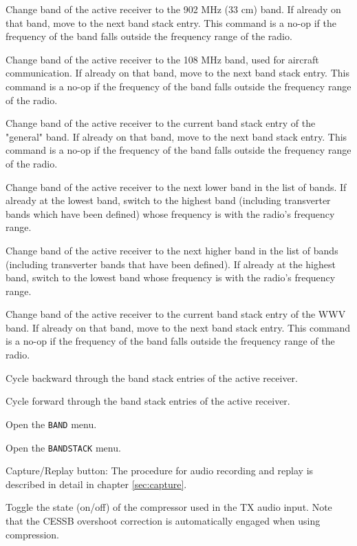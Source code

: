 \documentclass[12pt]{book}
\begin{document}
{Change band of the active receiver to the 902 MHz (33 cm) band. If already on that band, move to
the next band stack entry. This command is a no-op if the frequency of the band falls outside the frequency
range of the radio.}

{Change band of the active receiver to the 108 MHz band, used for aircraft communication. If already on that
band, move to
the next band stack entry. This command is a no-op if the frequency of the band falls outside the frequency
range of the radio.}

{Change band of the active receiver to the current band stack entry of the "general" band. If already on that
band, move to
the next band stack entry. This command is a no-op if the frequency of the band falls outside the frequency
range of the radio.}

{Change band of the active receiver to the next lower band in the list of bands. If already at the lowest
band, switch to the highest band (including transverter bands which have been defined) whose frequency is
with the radio's frequency range.}

{Change band of the active receiver to the next higher band in the list of bands (including transverter
bands that have been defined). If already at the highest band, switch to the lowest band whose frequency is
with the radio's frequency range.}

{Change band of the active receiver to the current band stack entry of the WWV band. If already on that band,
move to the next band stack entry. This command is a no-op if the frequency of the band falls outside the
frequency range of the radio.}

{Cycle backward through the band stack entries of the active receiver.}

{Cycle forward through the band stack entries of the active receiver.}

{Open the \texttt{BAND} menu.}

{Open the \texttt{BANDSTACK} menu.}

{Capture/Replay button: The procedure for audio recording and replay is described
in detail in chapter \ref{sec:capture}.}

{Toggle the state (on/off) of the compressor used in the TX audio input. Note that the CESSB overshoot
correction is automatically engaged when using compression.}
\end{document}
